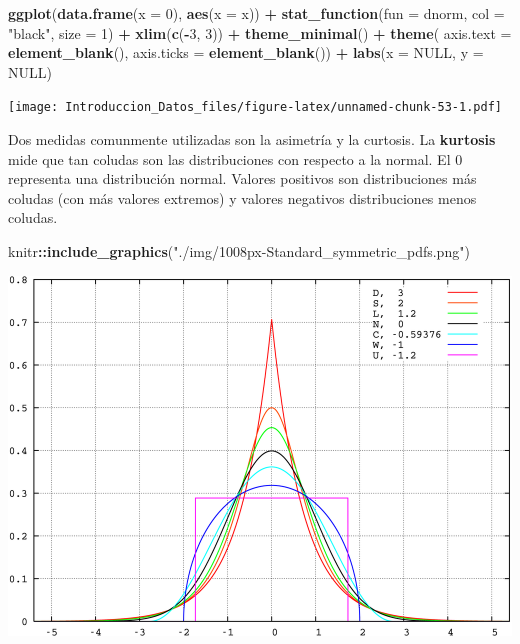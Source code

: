 \documentclass[spanish,]{book}
\newenvironment{Shaded}{\begin{snugshade}}{\end{snugshade}}
\newcommand{\KeywordTok}[1]{\textcolor[rgb]{0.13,0.29,0.53}{\textbf{#1}}}
\newcommand{\DataTypeTok}[1]{\textcolor[rgb]{0.13,0.29,0.53}{#1}}
\newcommand{\DecValTok}[1]{\textcolor[rgb]{0.00,0.00,0.81}{#1}}
\newcommand{\StringTok}[1]{\textcolor[rgb]{0.31,0.60,0.02}{#1}}
\newcommand{\OtherTok}[1]{\textcolor[rgb]{0.56,0.35,0.01}{#1}}
\newcommand{\OperatorTok}[1]{\textcolor[rgb]{0.81,0.36,0.00}{\textbf{#1}}}
\newcommand{\NormalTok}[1]{#1}
\begin{document}
\begin{Shaded}
\begin{Highlighting}[]
\KeywordTok{ggplot}\NormalTok{(}\KeywordTok{data.frame}\NormalTok{(}\DataTypeTok{x =} \DecValTok{0}\NormalTok{), }\KeywordTok{aes}\NormalTok{(}\DataTypeTok{x =}\NormalTok{ x)) }\OperatorTok{+}
\StringTok{    }\KeywordTok{stat_function}\NormalTok{(}\DataTypeTok{fun =}\NormalTok{ dnorm, }\DataTypeTok{col =} \StringTok{"black"}\NormalTok{, }\DataTypeTok{size =} \DecValTok{1}\NormalTok{) }\OperatorTok{+}
\StringTok{    }\KeywordTok{xlim}\NormalTok{(}\KeywordTok{c}\NormalTok{(}\OperatorTok{-}\DecValTok{3}\NormalTok{, }\DecValTok{3}\NormalTok{)) }\OperatorTok{+}
\StringTok{    }\KeywordTok{theme_minimal}\NormalTok{() }\OperatorTok{+}
\StringTok{    }\KeywordTok{theme}\NormalTok{(}
        \DataTypeTok{axis.text =} \KeywordTok{element_blank}\NormalTok{(),}
        \DataTypeTok{axis.ticks =} \KeywordTok{element_blank}\NormalTok{()) }\OperatorTok{+}
\StringTok{    }\KeywordTok{labs}\NormalTok{(}\DataTypeTok{x =} \OtherTok{NULL}\NormalTok{, }\DataTypeTok{y =} \OtherTok{NULL}\NormalTok{)}
\end{Highlighting}
\end{Shaded}

\texttt{[image: Introduccion\_Datos\_files/figure-latex/unnamed-chunk-53-1.pdf]}

Dos medidas comunmente utilizadas son la asimetría y la curtosis. La
\textbf{kurtosis} mide que tan coludas son las distribuciones con
respecto a la normal. El 0 representa una distribución normal. Valores
positivos son distribuciones más coludas (con más valores extremos) y
valores negativos distribuciones menos coludas.

\begin{Shaded}
\begin{Highlighting}[]
\NormalTok{knitr}\OperatorTok{::}\KeywordTok{include_graphics}\NormalTok{(}\StringTok{"./img/1008px-Standard_symmetric_pdfs.png"}\NormalTok{)}
\end{Highlighting}
\end{Shaded}

\begin{center}\includegraphics[width=0.75\linewidth]{./img/1008px-Standard_symmetric_pdfs} \end{center}
\end{document}
